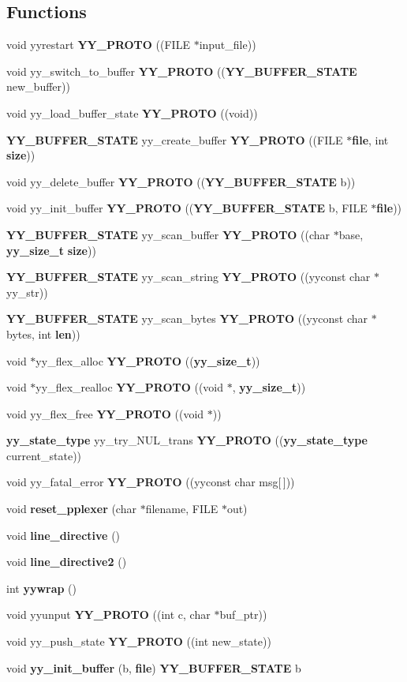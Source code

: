 \subsection*{Functions}
\begin{CompactItemize}
\item 
void yyrestart {\bf YY\_\-PROTO} ((FILE $\ast$input\_\-file))
\item 
void yy\_\-switch\_\-to\_\-buffer {\bf YY\_\-PROTO} (({\bf YY\_\-BUFFER\_\-STATE} new\_\-buffer))
\item 
void yy\_\-load\_\-buffer\_\-state {\bf YY\_\-PROTO} ((void))
\item 
{\bf YY\_\-BUFFER\_\-STATE} yy\_\-create\_\-buffer {\bf YY\_\-PROTO} ((FILE $\ast${\bf file}, int {\bf size}))
\item 
void yy\_\-delete\_\-buffer {\bf YY\_\-PROTO} (({\bf YY\_\-BUFFER\_\-STATE} b))
\item 
void yy\_\-init\_\-buffer {\bf YY\_\-PROTO} (({\bf YY\_\-BUFFER\_\-STATE} b, FILE $\ast${\bf file}))
\item 
{\bf YY\_\-BUFFER\_\-STATE} yy\_\-scan\_\-buffer {\bf YY\_\-PROTO} ((char $\ast$base, {\bf yy\_\-size\_\-t} {\bf size}))
\item 
{\bf YY\_\-BUFFER\_\-STATE} yy\_\-scan\_\-string {\bf YY\_\-PROTO} ((yyconst char $\ast$yy\_\-str))
\item 
{\bf YY\_\-BUFFER\_\-STATE} yy\_\-scan\_\-bytes {\bf YY\_\-PROTO} ((yyconst char $\ast$bytes, int {\bf len}))
\item 
void $\ast$yy\_\-flex\_\-alloc {\bf YY\_\-PROTO} (({\bf yy\_\-size\_\-t}))
\item 
void $\ast$yy\_\-flex\_\-realloc {\bf YY\_\-PROTO} ((void $\ast$, {\bf yy\_\-size\_\-t}))
\item 
void yy\_\-flex\_\-free {\bf YY\_\-PROTO} ((void $\ast$))
\item 
{\bf yy\_\-state\_\-type} yy\_\-try\_\-NUL\_\-trans {\bf YY\_\-PROTO} (({\bf yy\_\-state\_\-type} current\_\-state))
\item 
void yy\_\-fatal\_\-error {\bf YY\_\-PROTO} ((yyconst char msg[$\,$]))
\item 
void {\bf reset\_\-pplexer} (char $\ast$filename, FILE $\ast$out)
\item 
void {\bf line\_\-directive} ()
\item 
void {\bf line\_\-directive2} ()
\item 
int {\bf yywrap} ()
\item 
void yyunput {\bf YY\_\-PROTO} ((int c, char $\ast$buf\_\-ptr))
\item 
void yy\_\-push\_\-state {\bf YY\_\-PROTO} ((int new\_\-state))
\item 
void {\bf yy\_\-init\_\-buffer} (b, {\bf file}) {\bf YY\_\-BUFFER\_\-STATE} b
\end{CompactItemize}
